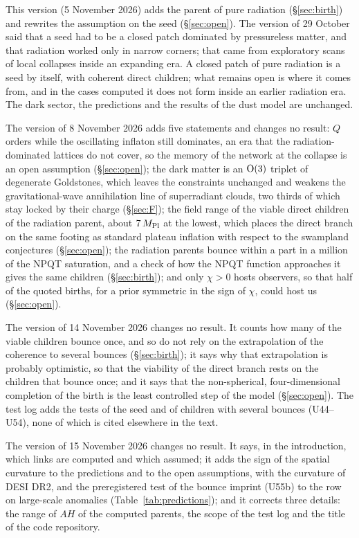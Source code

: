 \documentclass[11pt,a4paper]{article}
\newcommand{\Mpl}{M_{\rm Pl}}
\begin{document}
This version (5 November 2026) adds the parent of pure radiation (\S\ref{sec:birth}) and rewrites the assumption on the seed (\S\ref{sec:open}). The version of 29 October said that a seed had to be a closed patch dominated by pressureless matter, and that radiation worked only in narrow corners; that came from exploratory scans of local collapses inside an expanding era. A closed patch of pure radiation is a seed by itself, with coherent direct children; what remains open is where it comes from, and in the cases computed it does not form inside an earlier radiation era. The dark sector, the predictions and the results of the dust model are unchanged.

The version of 8 November 2026 adds five statements and changes no result: $Q$ orders while the oscillating inflaton still dominates, an era that the radiation-dominated lattices do not cover, so the memory of the network at the collapse is an open assumption (\S\ref{sec:open}); the dark matter is an ${\rm O}(3)$ triplet of degenerate Goldstones, which leaves the constraints unchanged and weakens the gravitational-wave annihilation line of superradiant clouds, two thirds of which stay locked by their charge (\S\ref{sec:F}); the field range of the viable direct children of the radiation parent, about $7\,\Mpl$ at the lowest, which places the direct branch on the same footing as standard plateau inflation with respect to the swampland conjectures (\S\ref{sec:open}); the radiation parents bounce within a part in a million of the NPQT saturation, and a check of how the NPQT function approaches it gives the same children (\S\ref{sec:birth}); and only $\chi>0$ hosts observers, so that half of the quoted births, for a prior symmetric in the sign of $\chi$, could host us (\S\ref{sec:open}).

The version of 14 November 2026 changes no result. It counts how many of the viable children bounce once, and so do not rely on the extrapolation of the coherence to several bounces (\S\ref{sec:birth}); it says why that extrapolation is probably optimistic, so that the viability of the direct branch rests on the children that bounce once; and it says that the non-spherical, four-dimensional completion of the birth is the least controlled step of the model (\S\ref{sec:open}). The test log adds the tests of the seed and of children with several bounces (U44--U54), none of which is cited elsewhere in the text.

The version of 15 November 2026 changes no result. It says, in the introduction, which links are computed and which assumed; it adds the sign of the spatial curvature to the predictions and to the open assumptions, with the curvature of DESI DR2, and the preregistered test of the bounce imprint (U55b) to the row on large-scale anomalies (Table~\ref{tab:predictions}); and it corrects three details: the range of $AH$ of the computed parents, the scope of the test log and the title of the code repository.
\end{document}
